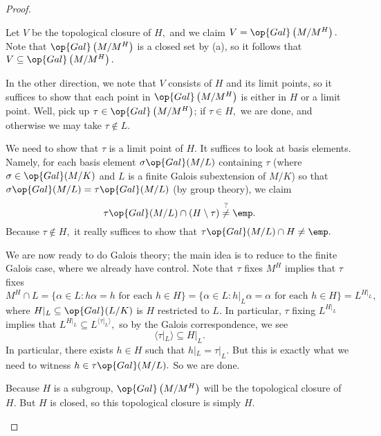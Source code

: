 \begin{proof}
\begin{listalph}
		\item Let $V$ be the topological closure of $H,$ and we claim $V=\op{Gal}\left(M/M^H\right).$ Note that $\op{Gal}\left(M/M^H\right)$ is a closed set by (a), so it follows that $V\subseteq\op{Gal}\left(M/M^H\right).$

		In the other direction, we note that $V$ consists of $H$ and its limit points, so it suffices to show that each point in $\op{Gal}\left(M/M^H\right)$ is either in $H$ or a limit point. Well, pick up $\tau\in\op{Gal}\left(M/M^H\right)$; if $\tau\in H,$ we are done, and otherwise we may take $\tau\notin L.$

		We need to show that $\tau$ is a limit point of $H.$ It suffices to look at basis elements. Namely, for each basis element $\sigma\op{Gal}(M/L)$ containing $\tau$ (where $\sigma\in\op{Gal}(M/K)$ and $L$ is a finite Galois subextension of $M/K$) so that $\sigma\op{Gal}(M/L)=\tau\op{Gal}(M/L)$ (by group theory), we claim
		\[\tau\op{Gal}(M/L)\cap(H\setminus\tau)\stackrel?\ne\emp.\]
		Because $\tau\notin H,$ it really suffices to show that $\tau\op{Gal}(M/L)\cap H\ne\emp.$

		We are now ready to do Galois theory; the main idea is to reduce to the finite Galois case, where we already have control. Note that $\tau$ fixes $M^H$ implies that $\tau$ fixes
		\[M^H\cap L=\{\alpha\in L:h\alpha=h\text{ for each }h\in H\}=\{\alpha\in L:h|_L\alpha=\alpha\text{ for each }h\in H\}=L^{H|_L},\]
		where $H|_L\subseteq\op{Gal}(L/K)$ is $H$ restricted to $L.$ In particular, $\tau$ fixing $L^{H|_L}$ implies that $L^{H|_L}\subseteq L^{\langle\tau|_L\rangle},$ so by the Galois correspondence, we see
		\[\langle\tau|_L\rangle\subseteq H|_L.\]
		In particular, there exists $h\in H$ such that $h|_L=\tau|_L.$ But this is exactly what we need to witness $h\in\tau\op{Gal}(M/L).$ So we are done.

		\item Because $H$ is a subgroup, $\op{Gal}\left(M/M^H\right)$ will be the topological closure of $H.$ But $H$ is closed, so this topological closure is simply $H.$
		\qedhere
	\end{listalph}
\end{proof}



